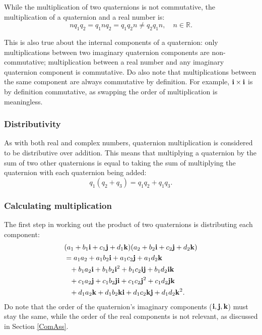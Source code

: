 \documentclass[10pt]{article}
\begin{document}
While the multiplication of two quaternions is not commutative, the multiplication of a quaternion and a real number is:
\begin{equation}
    nq_1q_2 = q_1nq_2 = q_1q_2n \neq q_2q_1n, \quad n \in \mathbb{R}.
\end{equation}

This is also true about the internal components of a quaternion: only multiplications between two imaginary quaternion components are non-commutative; multiplication between a real number and any imaginary quaternion component is commutative. Do also note that multiplications between the same component are always commutative by definition. For example, $\vb{i}\times\vb{i}$ is by definition commutative, as swapping the order of multiplication is meaningless.

\subsubsection{Distributivity}

As with both real and complex numbers, quaternion multiplication is considered to be distributive over addition. This means that multiplying a quaternion by the sum of two other quaternions is equal to taking the sum of multiplying the quaternion with each quaternion being added:
\begin{equation}
    q_1(q_2 + q_3) = q_1q_2 + q_1q_3.
\end{equation}

\subsubsection{Calculating multiplication} \label{InitialMult}

The first step in working out the product of two quaternions is distributing each component:
\begin{equation}
    \begin{aligned}
        & (a_1 + b_1\vb{i} + c_1\vb{j} + d_1\vb{k})(a_2 + b_2\vb{i} + c_2\vb{j} + d_2\vb{k}) \\
        & = a_1a_2 + a_1b_2\vb{i} + a_1c_2\vb{j} + a_1d_2\vb{k} \\
        & \phantom{=} + b_1a_2\vb{i} + b_1b_2\vb{i}^2 + b_1c_2\vb{i}\vb{j} + b_1d_2\vb{i}\vb{k} \\
        & \phantom{=} + c_1a_2\vb{j} + c_1b_2\vb{j}\vb{i} + c_1c_2\vb{j}^2 + c_1d_2\vb{j}\vb{k} \\
        & \phantom{=} + d_1a_2\vb{k} + d_1b_2\vb{k}\vb{i} + d_1c_2\vb{k}\vb{j} + d_1d_2\vb{k}^2.
    \end{aligned}
\end{equation}
Do note that the order of the quaternion's imaginary components ($\vb{i, j, k}$) must stay the same, while the order of the real components is not relevant, as discussed in Section \ref{ComAss}.
\end{document}
